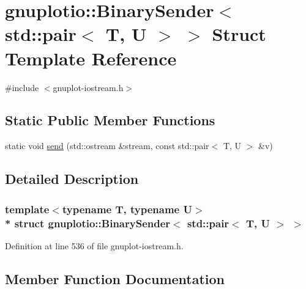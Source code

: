 \hypertarget{structgnuplotio_1_1_binary_sender_3_01std_1_1pair_3_01_t_00_01_u_01_4_01_4}{}\section{gnuplotio\+:\+:Binary\+Sender$<$ std\+:\+:pair$<$ T, U $>$ $>$ Struct Template Reference}
\label{structgnuplotio_1_1_binary_sender_3_01std_1_1pair_3_01_t_00_01_u_01_4_01_4}


{\ttfamily \#include $<$gnuplot-\/iostream.\+h$>$}

\subsection*{Static Public Member Functions}
\begin{DoxyCompactItemize}
\item 
static void \hyperlink{structgnuplotio_1_1_binary_sender_3_01std_1_1pair_3_01_t_00_01_u_01_4_01_4_a9d949c8e7b1dea493288b0a2dd95cbff}{send} (std\+::ostream \&stream, const std\+::pair$<$ T, U $>$ \&v)
\end{DoxyCompactItemize}


\subsection{Detailed Description}
\subsubsection*{template$<$typename T, typename U$>$\\*
struct gnuplotio\+::\+Binary\+Sender$<$ std\+::pair$<$ T, U $>$ $>$}



Definition at line 536 of file gnuplot-\/iostream.\+h.



\subsection{Member Function Documentation}
